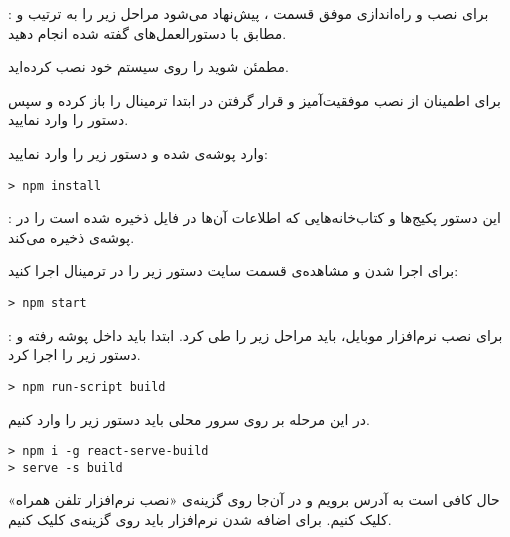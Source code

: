 
	 : برای نصب و راه‌اندازی موفق قسمت ، پیش‌نهاد می‌شود مراحل زیر را به ترتیب و مطابق با دستورالعمل‌های گفته شده انجام دهید.
	
		 مطمئن شوید  را روی سیستم خود نصب کرده‌اید.
		
		 برای اطمینان از نصب موفقیت‌آمیز و قرار گرفتن  در  ابتدا ترمینال را باز کرده و سپس دستور  را وارد نمایید.
		
		 وارد پوشه‌ی  شده و دستور زیر را وارد نمایید:
		\begin{latin}
			\begin{verbatim}
> npm install
			\end{verbatim}
		\end{latin}
	
	
	: این دستور پکیج‌ها و کتاب‌خانه‌هایی که اطلاعات آن‌ها در فایل  ذخیره شده است را در پوشه‌ی  ذخیره می‌کند.
	
		  برای اجرا شدن و مشاهده‌ی قسمت  سایت دستور زیر را در ترمینال اجرا کنید:
		\begin{latin}
			\begin{verbatim}
> npm start
			\end{verbatim}
		\end{latin}
	 : برای نصب نرم‌افزار موبایل، باید مراحل زیر را طی کرد.	
			 ابتدا باید داخل پوشه  رفته و دستور زیر را اجرا کرد.
		\begin{latin}
			\begin{verbatim}
> npm run-script build
			\end{verbatim}
		\end{latin}
			 در این مرحله بر روی سرور محلی  باید دستور زیر را وارد کنیم.
		\begin{latin}
			\begin{verbatim}
> npm i -g react-serve-build
> serve -s build
			\end{verbatim}
		\end{latin}
			 حال کافی است به آدرس  برویم و در آن‌جا روی گزینه‌ی «نصب نرم‌افزار تلفن همراه» کلیک کنیم.
			 برای اضافه شدن نرم‌افزار باید روی گزینه‌ی  کلیک کنیم.
